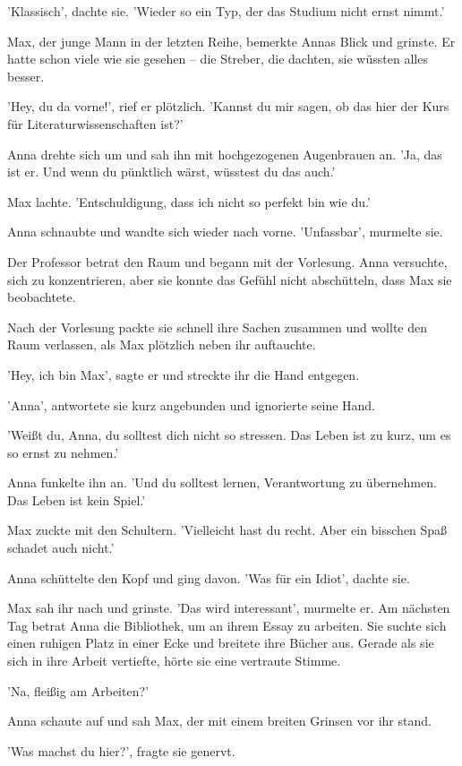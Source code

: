 \documentclass[12pt]{article}
\begin{document}
'Klassisch', dachte sie. 'Wieder so ein Typ, der das Studium nicht ernst nimmt.' 

Max, der junge Mann in der letzten Reihe, bemerkte Annas Blick und grinste. Er hatte schon viele wie sie gesehen – die Streber, die dachten, sie wüssten alles besser. 

'Hey, du da vorne!', rief er plötzlich. 'Kannst du mir sagen, ob das hier der Kurs für Literaturwissenschaften ist?' 

Anna drehte sich um und sah ihn mit hochgezogenen Augenbrauen an. 'Ja, das ist er. Und wenn du pünktlich wärst, wüsstest du das auch.' 

Max lachte. 'Entschuldigung, dass ich nicht so perfekt bin wie du.' 

Anna schnaubte und wandte sich wieder nach vorne. 'Unfassbar', murmelte sie. 

Der Professor betrat den Raum und begann mit der Vorlesung. Anna versuchte, sich zu konzentrieren, aber sie konnte das Gefühl nicht abschütteln, dass Max sie beobachtete. 

Nach der Vorlesung packte sie schnell ihre Sachen zusammen und wollte den Raum verlassen, als Max plötzlich neben ihr auftauchte. 

'Hey, ich bin Max', sagte er und streckte ihr die Hand entgegen. 

'Anna', antwortete sie kurz angebunden und ignorierte seine Hand. 

'Weißt du, Anna, du solltest dich nicht so stressen. Das Leben ist zu kurz, um es so ernst zu nehmen.' 

Anna funkelte ihn an. 'Und du solltest lernen, Verantwortung zu übernehmen. Das Leben ist kein Spiel.' 

Max zuckte mit den Schultern. 'Vielleicht hast du recht. Aber ein bisschen Spaß schadet auch nicht.' 

Anna schüttelte den Kopf und ging davon. 'Was für ein Idiot', dachte sie. 

Max sah ihr nach und grinste. 'Das wird interessant', murmelte er. Am nächsten Tag betrat Anna die Bibliothek, um an ihrem Essay zu arbeiten. Sie suchte sich einen ruhigen Platz in einer Ecke und breitete ihre Bücher aus. Gerade als sie sich in ihre Arbeit vertiefte, hörte sie eine vertraute Stimme. 

'Na, fleißig am Arbeiten?' 

Anna schaute auf und sah Max, der mit einem breiten Grinsen vor ihr stand. 

'Was machst du hier?', fragte sie genervt. 
\end{document}

